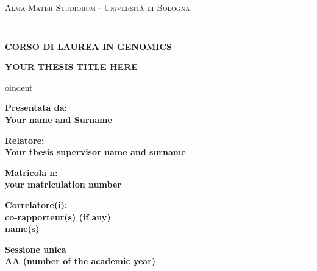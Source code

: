 \documentclass[12pt,a4paper]{article}
\begin{document}
\begin{titlepage}
\begin{center}
{{\Large{\textsc{Alma Mater Studiorum $\cdot$ Universit\`a di
Bologna}}}} \rule[0.1cm]{15.8cm}{0.1mm}
\rule[0.5cm]{15.8cm}{0.6mm}
{\small{\bf CORSO DI LAUREA IN GENOMICS }}
\end{center}
\vspace{15mm}
\begin{center}
{\LARGE{\bf YOUR THESIS TITLE HERE}}
\end{center}
\vspace{35mm}
\par

oindent
\begin{minipage}[t]{0.47\textwidth}
{\large{\bf Presentata da:\\
Your name and Surname\\}}
\end{minipage}
\hfill
\begin{minipage}[t]{0.47\textwidth}\raggedleft
{\large{\bf Relatore:\\
Your thesis supervisor name and surname}}
\end{minipage}
\begin{minipage}[t]{0.47\textwidth}
{\large{\bf Matricola n\degree:\\
your matriculation number}}
\end{minipage}
\hfill
\begin{minipage}[t]{0.47\textwidth}\raggedleft
{\large{\bf Correlatore(i):\\
co-rapporteur(s) (if any)\\ name(s)}}
\end{minipage}

\vspace{70mm}
\begin{center}
{\large{\bf Sessione unica\\
AA (number of the academic year) }}
\end{center}
\end{titlepage}
\end{document}
